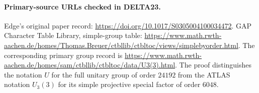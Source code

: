 \paragraph{Primary-source URLs checked in DELTA23.}
Edge's original paper record:
\url{https://doi.org/10.1017/S0305004100034472}.
GAP Character Table Library, simple-group table:
\url{https://www.math.rwth-aachen.de/homes/Thomas.Breuer/ctbllib/ctbltoc/views/simplebyorder.html}.
The corresponding primary group record is
\url{https://www.math.rwth-aachen.de/homes/sam/ctbllib/ctbltoc/data/U3(3).html}.
The proof distinguishes the notation $U$ for the full
unitary group of order $24192$ from the ATLAS notation
$U_3(3)$ for its simple projective special factor of
order $6048$.
